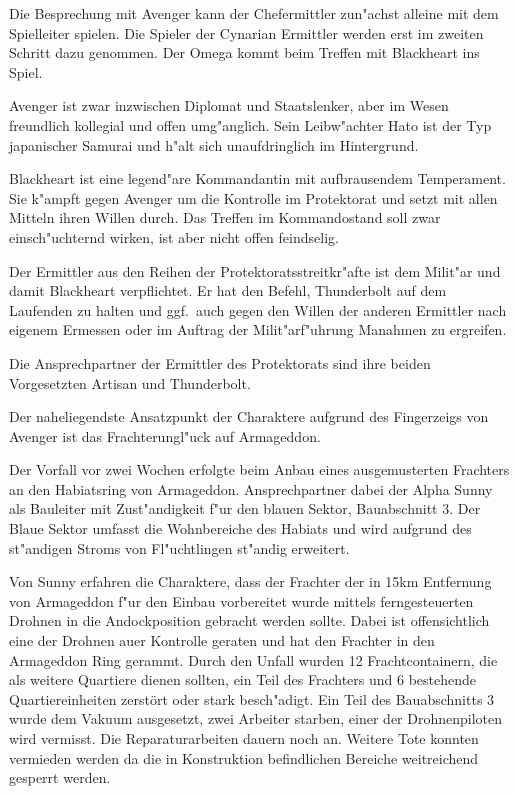 \begin{remarks}
	Die Besprechung mit Avenger kann der Chefermittler zun"achst alleine mit dem Spielleiter spielen. Die Spieler der Cynarian Ermittler werden erst im zweiten Schritt dazu genommen. Der Omega kommt beim Treffen mit Blackheart ins Spiel.
	
	Avenger ist zwar inzwischen Diplomat und Staatslenker, aber im Wesen freundlich kollegial und offen umg"anglich. Sein Leibw"achter Hato ist der Typ japanischer Samurai und h"alt sich unaufdringlich im Hintergrund.
	
	Blackheart ist eine legend"are Kommandantin mit aufbrausendem Temperament. Sie k"ampft gegen Avenger um die Kontrolle im Protektorat und setzt mit allen Mitteln ihren Willen durch. Das Treffen im Kommandostand soll zwar einsch"uchternd wirken, ist aber nicht offen feindselig.
	
	Der Ermittler aus den Reihen der Protektoratsstreitkr"afte ist dem Milit"ar und damit Blackheart verpflichtet. Er hat den Befehl, Thunderbolt auf dem Laufenden zu halten und ggf.~auch gegen den Willen der anderen Ermittler nach eigenem Ermessen oder im Auftrag der Milit"arf"uhrung Ma\3nahmen zu ergreifen.

	Die Ansprechpartner der Ermittler des Protektorats sind ihre beiden Vorgesetzten Artisan und Thunderbolt.
\end{remarks}


Der naheliegendste Ansatzpunkt der Charaktere aufgrund des Fingerzeigs von Avenger ist das Frachterungl"uck auf Armageddon.

Der Vorfall vor zwei Wochen erfolgte beim Anbau eines ausgemusterten Frachters an den Habiatsring von Armageddon. Ansprechpartner dabei der Alpha Sunny als Bauleiter mit Zust"andigkeit f"ur den blauen Sektor, Bauabschnitt 3. Der Blaue Sektor umfasst die Wohnbereiche des Habiats und wird aufgrund des st"andigen Stroms von Fl"uchtlingen st"andig erweitert.

Von Sunny erfahren die Charaktere, dass der Frachter der in 15km Entfernung von Armageddon f"ur den Einbau vorbereitet wurde mittels ferngesteuerten Drohnen in die Andockposition gebracht werden sollte. Dabei ist offensichtlich eine der Drohnen au\3er Kontrolle geraten und hat den Frachter in den Armageddon Ring gerammt. Durch den Unfall wurden 12 Frachtcontainern, die als weitere Quartiere dienen sollten, ein Teil des Frachters und 6 bestehende Quartiereinheiten zerstört oder stark besch"adigt. Ein Teil des Bauabschnitts 3 wurde dem Vakuum ausgesetzt, zwei Arbeiter starben, einer der Drohnenpiloten wird vermisst. Die Reparaturarbeiten dauern noch an. Weitere Tote konnten vermieden werden da die in Konstruktion befindlichen Bereiche weitreichend gesperrt werden.

